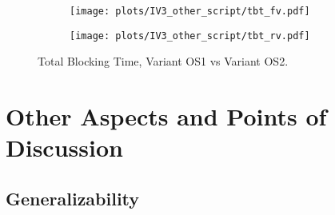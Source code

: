\begin{figure}
	\centering
	\begin{subfigure}{.5\textwidth}
		\centering
		\texttt{[image: plots/IV3\_other\_script/tbt\_fv.pdf]}
		\label{fig:sub1}
	\end{subfigure}%
	\begin{subfigure}{.5\textwidth}
		\centering
		\texttt{[image: plots/IV3\_other\_script/tbt\_rv.pdf]}
		\label{fig:sub2}
	\end{subfigure}
	\caption{Total Blocking Time, Variant OS1 vs Variant OS2.}
	\label{figure:plt_original_test}
\end{figure}

















\section{Other Aspects and Points of Discussion}






\subsection{Generalizability}





